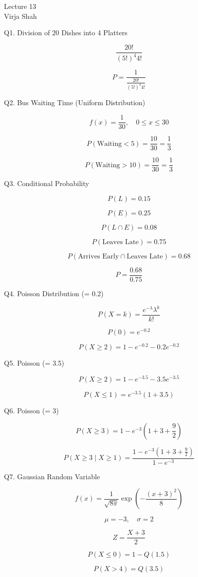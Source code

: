 \documentclass{article}
\begin{document}
\begin{center}
Lecture 13 \\
Virja Shah
\end{center}

Q1. Division of 20 Dishes into 4 Platters

\[
\frac{20!}{(5!)^4 4!}
\]

\[
P = \frac{1}{\frac{20!}{(5!)^4 4!}}
\]

Q2. Bus Waiting Time (Uniform Distribution)

\[
f(x) = \frac{1}{30}, \quad 0 \le x \le 30
\]

\[
P(\text{Waiting} < 5) = \frac{10}{30} = \frac{1}{3}
\]

\[
P(\text{Waiting} > 10) = \frac{10}{30} = \frac{1}{3}
\]

Q3. Conditional Probability

\[
P(L) = 0.15
\]

\[
P(E) = 0.25
\]

\[
P(L \cap E) = 0.08
\]

\[
P(\text{Leaves Late}) = 0.75
\]

\[
P(\text{Arrives Early} \cap \text{Leaves Late}) = 0.68
\]

\[
P = \frac{0.68}{0.75}
\]

Q4. Poisson Distribution (\lambda = 0.2)

\[
P(X=k) = \frac{e^{-\lambda} \lambda^k}{k!}
\]

\[
P(0) = e^{-0.2}
\]

\[
P(X \ge 2) = 1 - e^{-0.2} - 0.2 e^{-0.2}
\]

Q5. Poisson (\lambda = 3.5)

\[
P(X \ge 2) = 1 - e^{-3.5} - 3.5 e^{-3.5}
\]

\[
P(X \le 1) = e^{-3.5}(1 + 3.5)
\]

Q6. Poisson (\lambda = 3)

\[
P(X \ge 3) = 1 - e^{-3}\left(1 + 3 + \frac{9}{2}\right)
\]

\[
P(X \ge 3 \mid X \ge 1) =
\frac{1 - e^{-3}\left(1 + 3 + \frac{9}{2}\right)}{1 - e^{-3}}
\]


Q7. Gaussian Random Variable

\[
f(x) = \frac{1}{\sqrt{8\pi}} \exp\left(-\frac{(x+3)^2}{8}\right)
\]

\[
\mu = -3, \quad \sigma = 2
\]

\[
Z = \frac{X + 3}{2}
\]

\[
P(X \le 0) = 1 - Q(1.5)
\]

\[
P(X > 4) = Q(3.5)
\]
\end{document}
